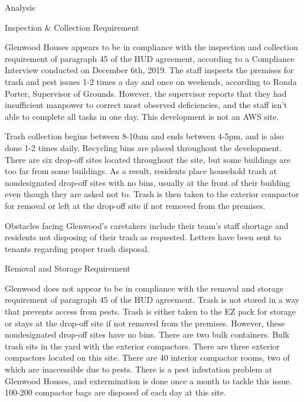 Analysis\par \vspace{.7\baselineskip}Inspection \& Collection Requirement\par \vspace{.7\baselineskip}Glenwood Houses appears to be in compliance with the inspection and collection requirement of paragraph 45 of the HUD agreement, according to a Compliance Interview conducted on December 6th, 2019. The staff inspects the premises for trash and pest issues 1-2 times a day and once on weekends, according to Ronda Porter, Supervisor of Grounds. However, the supervisor reports that they had insufficient manpower to correct most observed deficiencies, and the staff isn't able to complete all tasks in one day. This development is not an AWS site.\par \vspace{.7\baselineskip}Trash collection begins between 8-10am and ends between 4-5pm, and is also done 1-2 times daily. Recycling bins are placed throughout the development. There are six drop-off sites located throughout the site, but some buildings are too far from some buildings. As a result, residents place household trash at nondesignated drop-off sites with no bins, usually at the front of their building even though they are asked not to. Trash is then taken to the exterior compactor for removal or left at the drop-off site if not removed from the premises. \par \vspace{.7\baselineskip}Obstacles facing Glenwood's caretakers include their team's staff shortage and residents not disposing of their trash as requested. Letters have been sent to tenants regarding proper trash disposal.\par \vspace{.7\baselineskip}Removal and Storage Requirement\par \vspace{.7\baselineskip}Glenwood does not appear to be in compliance with the removal and storage requirement of paragraph 45 of the HUD agreement. Trash is not stored in a way that prevents access from pests. Trash is either taken to the EZ pack for storage or stays at the drop-off site if not removed from the premises. However, these nondesignated drop-off sites have no bins. There are two bulk containers. Bulk trash sits in the yard with the exterior compactors. There are three exterior compactors located on this site. There are 40 interior compactor rooms, two of which are inaccessible due to pests. There is a pest infestation problem at Glenwood Houses, and extermination is done once a month to tackle this issue. 100-200 compactor bags are disposed of each day at this site.